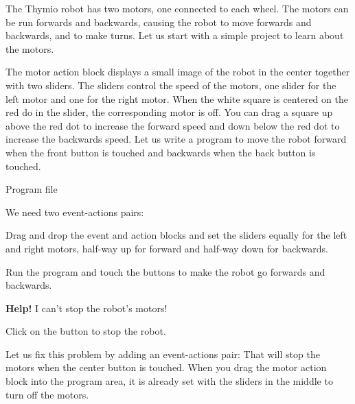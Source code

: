 
\label{ch.moving}


The Thymio robot has two motors, one connected to each wheel. The motors
can be run forwards and backwards, causing the robot to move forwards
and backwards, and to make turns. Let us start with a simple project to
learn about the motors.

The motor action block  displays a small image of
the robot in the center together with two sliders. The sliders control
the speed of the motors, one slider for the left motor and one for the
right motor. When the white square is centered on the red do in the
slider, the corresponding motor is off. You can drag a square up above
the red dot to increase the forward speed and down below the red dot to
increase the backwards speed. Let us write a program to move the robot
forward when the front button is touched and backwards when the back
button is touched.

{\raggedleft \hfill Program file }

We need two event-actions pairs:

\begin{center}
\end{center}

Drag and drop the event and action blocks and set the sliders equally
for the left and right motors, half-way up for forward and half-way down
for backwards.

Run the program and touch the buttons to make the robot go forwards and
backwards.


\textbf{Help!} I can't stop the robot's motors!

Click on the button  to stop the robot.

\newpage

Let us fix this problem by adding an event-actions pair:
 That will stop the motors when the center button is
touched. When you drag the motor action block into the program area, it
is already set with the sliders in the middle to turn off the motors.


